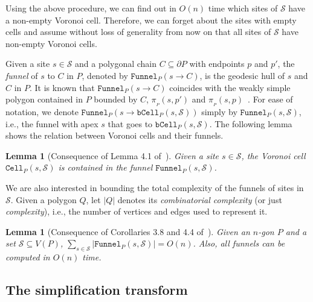 \documentclass[a4paper, 11pt]{article}
\newtheorem{lemma}[theorem]{Lemma}
\newcommand{\s}{\mathcal S}
\newcommand{\p}[3][P]{\ensuremath{\pi_{_{#1}}(#2, #3)}}
\newcommand{\funnel}[2][P]{\ensuremath{\mathtt{Funnel}_{\scriptscriptstyle #1}(#2)}}
\newcommand{\cell}[2][P]{\ensuremath{\mathtt{Cell}_{\scriptscriptstyle #1}(#2)}}
\newcommand{\bcell}[2][P]{\ensuremath{\mathtt{bCell}_{\scriptscriptstyle #1}(#2)}}
\begin{document}
Using the above procedure, we can find out in $O(n)$ time which sites of $\s$ have a non-empty Voronoi cell. 
Therefore, we can forget about the sites with empty cells and assume without loss of generality from now on that all sites of $\s$ have non-empty Voronoi cells.

Given a site $s\in \s$ and a polygonal chain $C \subseteq \partial P$ with endpoints $p$ and $p'$, the \emph{funnel} of $s$ to $C$ in $P$, denoted by $\funnel{s\to C}$, 
is the geodesic hull of $s$ and $C$ in $P$. 
It is known that $\funnel{s\to C}$ coincides with the weakly simple polygon contained in $P$ bounded by $C$, $\p{s}{p'}$ and $\p{s}{p}$~\cite{ahn2015linear}.
For ease of notation, we denote $\funnel{s \to \bcell{s, \s}}$ simply by $\funnel{s, \s}$, i.e., the funnel with apex $s$ that goes to $\bcell{s, \s}$.
The following lemma shows the relation between Voronoi cells and their funnels.


\begin{lemma}[Consequence of Lemma 4.1 of~\cite{ahn2015linear}]\label{lemma:Voronoi cell in funnel}
Given a site $s\in \s$, the Voronoi cell $\cell{s, \s}$ is contained in the funnel $\funnel{s, \s}$.
\end{lemma}

We are also interested in bounding the total complexity of the funnels of sites in $\s$.
Given a polygon $Q$, let $|Q|$ denotes its \emph{combinatorial complexity} (or just \emph{complexity}), i.e., the number of vertices and edges used to represent it. 

\begin{lemma}[Consequence of Corollaries 3.8 and 4.4 of~\cite{ahn2015linear}]\label{lemma:Complexity of funnels}
Given an $n$-gon $P$ and a set $\s\subseteq V(P)$, $\sum_{s\in \s} |\funnel{s, \s}| = O(n)$.
Also, all funnels can be computed in $O(n)$ time. 
\end{lemma}

\subsection{The simplification transform}\label{section:Simplification}
\end{document}
